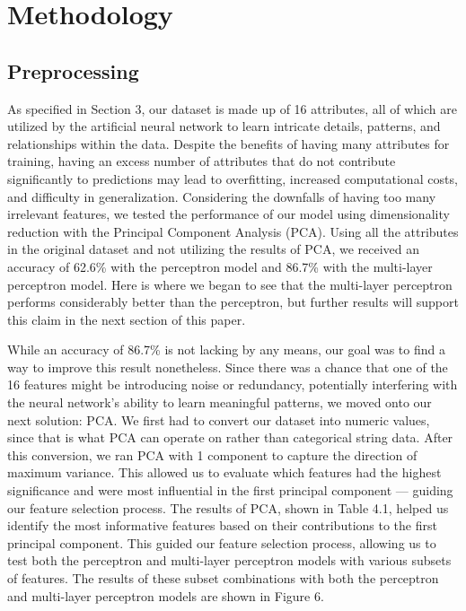 \documentclass[conference]{IEEEtran}
\begin{document}
\section{Methodology}
\subsection{Preprocessing}
As specified in Section 3, our dataset is made up of 16 attributes, all of which are utilized by the artificial neural network to learn intricate details, patterns, and relationships within the data. Despite the benefits of having many attributes for training, having an excess number of attributes that do not contribute significantly to predictions may lead to overfitting, increased computational costs, and difficulty in generalization. Considering the downfalls of having too many irrelevant features, we tested the performance of our model using dimensionality reduction with the Principal Component Analysis (PCA). Using all the attributes in the original dataset and not utilizing the results of PCA, we received an accuracy of 62.6\% with the perceptron model and 86.7\% with the multi-layer perceptron model. Here is where we began to see that the multi-layer perceptron performs considerably better than the perceptron, but further results will support this claim in the next section of this paper. 

While an accuracy of 86.7\% is not lacking by any means, our goal was to find a way to improve this result nonetheless. Since there was a chance that one of the 16 features might be introducing noise or redundancy, potentially interfering with the neural network’s ability to learn meaningful patterns, we moved onto our next solution: PCA. We first had to convert our dataset into numeric values, since that is what PCA can operate on rather than categorical string data. After this conversion, we ran PCA with 1 component to capture the direction of maximum variance. This allowed us to evaluate which features had the highest significance and were most influential in the first principal component — guiding our feature selection process. The results of PCA, shown in Table 4.1, helped us identify the most informative features based on their contributions to the first principal component. This guided our feature selection process, allowing us to test both the perceptron and multi-layer perceptron models with various subsets of features. The results of these subset combinations with both the perceptron and multi-layer perceptron models are shown in Figure 6.
\end{document}
